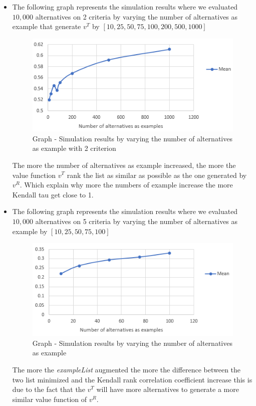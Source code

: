 \documentclass{report}
\begin{document}
\begin{itemize}
\item The following graph represents the simulation results where we evaluated $10,000$ alternatives on 2 criteria by varying the number of alternatives as example that generate $v^T$ by $[10, 25, 50, 75, 100, 200, 500, 1000]$ 
\begin{figure}[H]
\centering
\includegraphics[keepaspectratio]{graph-04.PNG}
\caption{Graph - Simulation results by varying the number of alternatives as example with 2 criterion}
\end{figure}
The more the number of alternatives as example increased, the more the value function $v^T$ rank the list as similar as possible as the one generated by $v^R$. Which explain why more the numbers of example increase the more Kendall tau get close to 1. \\
\newpage
\item The following graph represents the simulation results where we evaluated $10,000$ alternatives on 5 criteria by varying the number of alternatives as example by $[10, 25, 50, 75, 100]$ 
\begin{figure}[H]
\centering
\includegraphics[keepaspectratio]{graph-03.PNG}
\caption{Graph - Simulation results by varying the number of alternatives as example}
\end{figure}
The more the \textit{exampleList} augmented the more the difference between the two list minimized and the Kendall rank correlation coefficient increase this is due to the fact that the $v^T$ will have more alternatives to generate a more similar value function of $v^R$.
\end{itemize}
\end{document}
